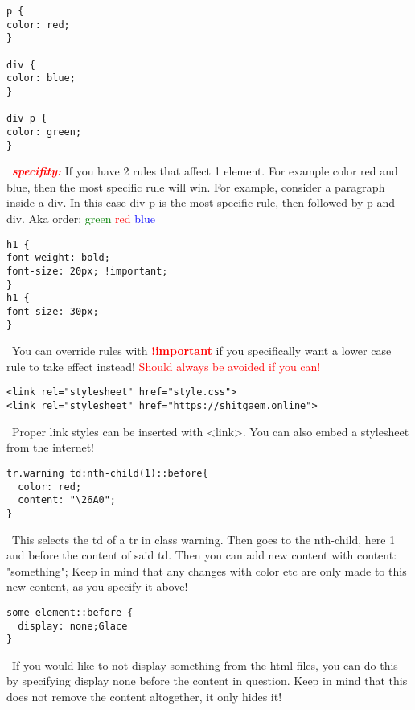 \documentclass[main.tex,fontsize=6pt,paper=a4,paper=landscape,DIV=calc,]{scrartcl}
\begin{document}
\begin{multicols*}{4}
\begin{lstlisting}
p {
color: red;
}

div {
color: blue;
}

div p {
color: green;
}
\end{lstlisting}
\, \newline 
\textcolor{red}{\textbf{\emph{specifity:}}} \newline
If you have 2 rules that affect 1 element. For example color red and blue, then the most specific rule will win.\newline
For example, consider a paragraph inside a div.\newline
In this case div p is the most specific rule, then followed by p and div.\newline
Aka order: \textcolor{green}{green} \textcolor{red}{red} \textcolor{blue}{blue}

\begin{lstlisting}
h1 {
font-weight: bold;
font-size: 20px; !important;
}
h1 {
font-size: 30px;
}
\end{lstlisting}
\, \newline
 You can override rules with \textbf{\textcolor{red}{!important}} if you specifically want a lower case rule to take effect instead!\newline
\textcolor{red}{Should always be avoided if you can!}

\begin{lstlisting}
<link rel="stylesheet" href="style.css">
<link rel="stylesheet" href="https://shitgaem.online">
\end{lstlisting}
\, \newline  
Proper link styles can be inserted with <link>. You can also embed a stylesheet from the internet!

\begin{lstlisting}
tr.warning td:nth-child(1)::before{
  color: red;
  content: "\26A0";
}
\end{lstlisting}
\, \newline
 This selects the td of a tr in class warning. Then goes to the nth-child, here 1 and before the content of said td.\newline
Then you can add new content with content: "something";\newline
Keep in mind that any changes with color etc are only made to this new content,\newline 
as you specify it above!


\begin{lstlisting}
some-element::before {
  display: none;Glace
}
\end{lstlisting}
\, \newline
 If you would like to not display something from the html files, you can do this by specifying
display none before the content in question. \newline Keep in mind that this does not remove the content altogether, it only hides it!



\end{multicols*}
\end{document}
